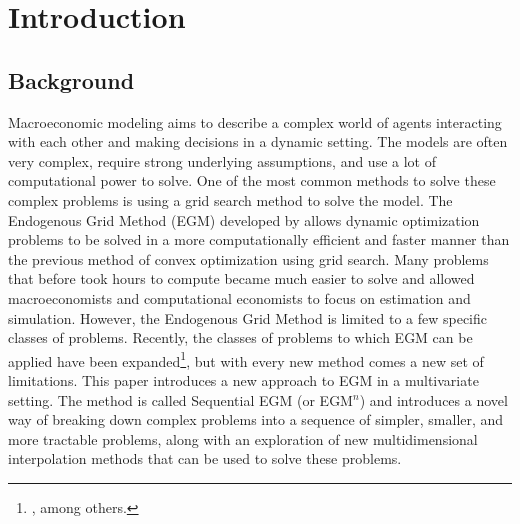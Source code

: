 \documentclass{article}
\begin{document}
\section{Introduction}\label{introduction}

\subsection{Background}\label{Background}




Macroeconomic modeling aims to describe a complex world of agents interacting with each other and making decisions in a dynamic setting. The models are often very complex, require strong underlying assumptions, and use a lot of computational power to solve. One of the most common methods to solve these complex problems is using a grid search method to solve the model. The Endogenous Grid Method (EGM) developed by \citet{Carroll2006} allows dynamic optimization problems to be solved in a more computationally efficient and faster manner than the previous method of convex optimization using grid search. Many problems that before took hours to compute became much easier to solve and allowed macroeconomists and computational economists to focus on estimation and simulation.
However, the Endogenous Grid Method is limited to a few specific classes of problems. Recently, the classes of problems to which EGM can be applied have been expanded\footnote{\citet{Barillas2007, Maliar2013, Fella2014, White2015, Iskhakov2017}, among others.}, but with every new method comes a new set of limitations.
This paper introduces a new approach to EGM in a multivariate setting. The method is called Sequential EGM (or EGM$^n$) and introduces a novel way of breaking down complex problems into a sequence of simpler, smaller, and more tractable problems, along with an exploration of new multidimensional interpolation methods that can be used to solve these problems.
\end{document}
